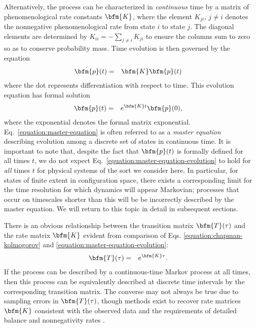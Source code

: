 Alternatively, the process can be characterized in {\em continuous} time by a matrix of phenomenological rate constants $\bfm{K}$, where the element $K_{ji}$, $j \ne i$ denotes the nonnegative phenomenological rate from state $i$ to state $j$.
The diagonal elements are determined by $K_{ii} = - \sum_{j \ne i} K_{ji}$ to ensure the columns sum to zero so as to conserve probability mass.
Time evolution is then governed by the equation
\begin{eqnarray}
\dot{\bfm{p}}(t) &=& \bfm{K} \bfm{p}(t) \label{equation:master-equation}
\end{eqnarray}
where the dot represents differentiation with respect to time.
This evolution equation has formal solution
\begin{eqnarray}
\bfm{p}(t) &=& e^{\bfm{K} t} \bfm{p}(0) \label{equation:master-equation-evolution} ,
\end{eqnarray}
where the exponential denotes the formal matrix exponential.
Eq.\ \ref{equation:master-equation} is often referred to as a \emph{master equation} \cite{vankampen,oppenheim:1977a} describing evolution among a discrete set of states in continuous time.
It is important to note that, despite the fact that $\bfm{p}(t)$ is formally defined for all times $t$, we do not expect Eq.\ \ref{equation:master-equation-evolution} to hold for \emph{all} times $t$ for physical systems of the sort we consider here.
In particular, for states of finite extent in configuration space, there exists a corresponding limit for the time resolution for which dynamics will appear Markovian; processes that occur on timescales shorter than this will be be incorrectly described by the master equation.
We will return to this topic in detail in subsequent sections.

There is an obvious relationship between the transition matrix $\bfm{T}(\tau)$ and the rate matrix $\bfm{K}$ evident from comparison of Eqs. \ref{equation:chapman-kolmogorov} and \ref{equation:master-equation-evolution}:
\begin{eqnarray}
\bfm{T}(\tau) &=& e^{\bfm{K} \tau} . \label{equation:relation-between-transition-and-rate-matrices}
\end{eqnarray}
If the process can be described by a continuous-time Markov process at all times, then this process can be equivalently described at discrete time intervals by the corresponding transition matrix.
The converse may not always be true due to sampling errors in $\bfm{T}(\tau)$, though methods exist to recover rate matrices $\bfm{K}$ consistent with the observed data and the requirements of detailed balance and nonnegativity rates \cite{grubmueller:1994a,sriraman:2005a}.

